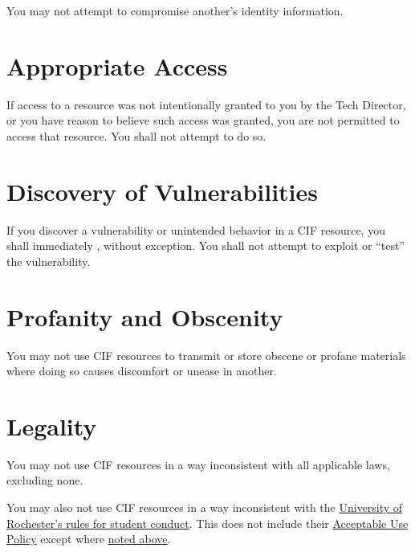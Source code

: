 \documentclass[12pt]{article}
\newcommand{\rochesterAUP}[1]{\href{https://tech.rochester.edu/policies/acceptable-use-policy/}{#1}}
\begin{document}
You may not attempt to compromise another's identity information.


\section{Appropriate Access} %

If access to a resource was not intentionally granted to you by the Tech Director, or you have reason to believe such access was granted, you are not permitted to access that resource. You shall not attempt to do so.


\section{Discovery of Vulnerabilities} %

If you discover a vulnerability or unintended behavior in a CIF resource, you shall immediately , without exception. You shall not attempt to exploit or ``test'' the vulnerability.


\section{Profanity and Obscenity} %

You may not use CIF resources to transmit or store obscene or profane materials where doing so causes discomfort or unease in another.


\section{Legality} %

You may not use CIF resources in a way inconsistent with all applicable laws, excluding none.

You may also not use CIF resources in a way inconsistent with the \href{http://www.rochester.edu/college/odos/conduct/}{University of Rochester's rules for student conduct}. This does not include their \rochesterAUP{Acceptable Use Policy} except where \hyperref[sec:rochester-aup]{noted above}.

\end{document}
